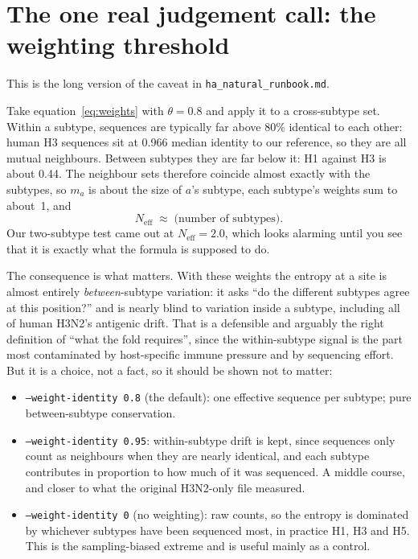 \documentclass[11pt,a4paper]{article}
\newcommand{\file}[1]{\texttt{#1}}
\newcommand{\Neff}{N_{\mathrm{eff}}}
\begin{document}
\section{The one real judgement call: the weighting threshold}
\label{sec:weighting}

This is the long version of the caveat in \file{ha\_natural\_runbook.md}.

Take equation~\eqref{eq:weights} with $\theta = 0.8$ and apply it to a
cross-subtype set. Within a subtype, sequences are typically far above 80\%
identical to each other: human H3 sequences sit at 0.966 median identity to our
reference, so they are all mutual neighbours. Between subtypes they are far
below it: H1 against H3 is about 0.44. The neighbour sets therefore coincide
almost exactly with the subtypes, so $m_a$ is about the size of $a$'s subtype,
each subtype's weights sum to about~1, and
\begin{equation}
  \Neff \;\approx\; \text{(number of subtypes)} .
\end{equation}
Our two-subtype test came out at $\Neff = 2.0$, which looks alarming until you
see that it is exactly what the formula is supposed to do.

The consequence is what matters. With these weights the entropy at a site is
almost entirely \emph{between}-subtype variation: it asks ``do the different
subtypes agree at this position?'' and is nearly blind to variation inside a
subtype, including all of human H3N2's antigenic drift. That is a defensible and
arguably the right definition of ``what the fold requires'', since the
within-subtype signal is the part most contaminated by host-specific immune
pressure and by sequencing effort. But it is a choice, not a fact, so it should
be shown not to matter:

\begin{itemize}
  \item \file{--weight-identity 0.8} (the default): one effective sequence per
    subtype; pure between-subtype conservation.
  \item \file{--weight-identity 0.95}: within-subtype drift is kept, since
    sequences only count as neighbours when they are nearly identical, and each
    subtype contributes in proportion to how much of it was sequenced. A middle
    course, and closer to what the original H3N2-only file measured.
  \item \file{--weight-identity 0} (no weighting): raw counts, so the entropy is
    dominated by whichever subtypes have been sequenced most, in practice H1, H3
    and H5. This is the sampling-biased extreme and is useful mainly as a
    control.
\end{itemize}
\end{document}
